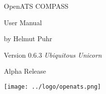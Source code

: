 \documentclass[oneside,a4paper]{memoir}
\begin{document}
\firmlists
\midsloppy
\raggedbottom


%

\frontmatter
\pagestyle{empty}


\vspace*{\fill}
\begin{center}
\HUGE\textsf{OpenATS COMPASS}\par
\end{center}

\begin{center}
\Huge\textsf{User Manual}\par
\end{center}
\begin{center}
\normalsize\textsf{by Helmut Puhr}\par
\medskip
\normalsize\textsf{Version 0.6.3 \textit{Ubiquitous Unicorn}}\par\textsf{Alpha Release}\par
\end{center}
\vspace*{\fill}
\begin{center}
\texttt{[image: ../logo/openats.png]}
\setlength{\droptitle}{0pt}%
\end{center}
\clearpage

\cleardoublepage

\pagestyle{headings}

\setupshorttoc
\tableofcontents
\clearpage
\setupparasubsecs
\setupmaintoc
\tableofcontents
\setlength{\unitlength}{1pt}
\clearpage
\listoffigures
\clearpage
\listoftables
\clearpage







%










\end{document}
